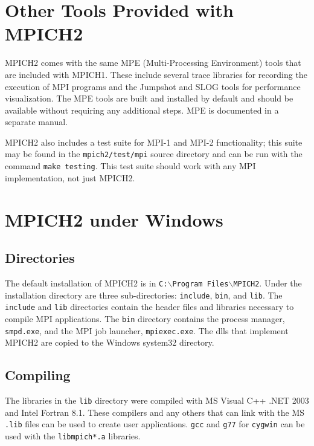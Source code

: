 \documentclass[dvipdfm,11pt]{article}
\begin{document}
\section{Other Tools Provided with MPICH2}
\label{sec:other-tools}
MPICH2 comes with the same MPE (Multi-Processing Environment) tools that are
included with MPICH1.  These include several trace libraries for recording the
execution of MPI programs and the Jumpshot and SLOG tools for performance
visualization.  The MPE tools are built and installed by default and should be
available without requiring any additional steps.  MPE is documented in 
a separate manual.

MPICH2 also includes a test suite for MPI-1 and MPI-2 functionality; this
suite may be found in the \texttt{mpich2/test/mpi} source directory and can be
run with the command \texttt{make testing}.  This test suite should work with
any MPI implementation, not just MPICH2.

\section{MPICH2 under Windows}
\label{sec:windows}

\subsection{Directories}
\label{sec:windir}

The default installation of MPICH2 is in
\texttt{C:$\backslash$Program Files$\backslash$MPICH2}. Under the installation
directory are three sub-directories: \texttt{include}, \texttt{bin}, and
\texttt{lib}.  The \texttt{include} and \texttt{lib} directories contain
the header files and libraries necessary to compile MPI applications.  
The \texttt{bin} directory contains the process manager, \texttt{smpd.exe},
and the MPI job launcher, \texttt{mpiexec.exe}.  The dlls that implement
MPICH2 are copied to the Windows system32 directory.

\subsection{Compiling}
\label{sec:wincompile}

The libraries in the \texttt{lib} directory were compiled with MS Visual C++ .NET 2003
and Intel Fortran 8.1.  These 
compilers and any others that can link with the MS \texttt{.lib} files can be used to
create user applications.  \texttt{gcc} and \texttt{g77} for \texttt{cygwin} can be used with the 
\texttt{libmpich*.a} libraries.
\end{document}
